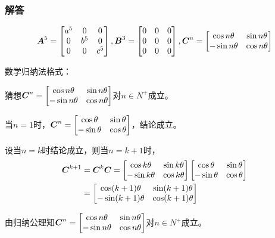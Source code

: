\documentclass{beamer}
\begin{document}
\begin{frame}[allowframebreaks]
\frametitle{解答}

    \begin{equation*}
\boldsymbol{A}^5=\begin{bmatrix}a^5&0&0\\0&b^5&0\\0&0&c^5\end{bmatrix},\boldsymbol{B}^3=\begin{bmatrix}0&0&0\\0&0&0\\0&0&0\end{bmatrix},\boldsymbol{C}^n=\begin{bmatrix}\cos n\theta&\sin n\theta\\-\sin n\theta&\cos n\theta\end{bmatrix}
    \end{equation*}

    数学归纳法格式：

    猜想\(\boldsymbol{C}^n=\begin{bmatrix}\cos n\theta&\sin n\theta\\-\sin n\theta&\cos n\theta\end{bmatrix}\)对\(n\in N^+\)成立。

    当\(n=1\)时，\(\boldsymbol{C}^n=\begin{bmatrix}\cos \theta&\sin \theta\\-\sin \theta&\cos \theta\end{bmatrix}\)，结论成立。

    设当\(n=k\)时结论成立，则当\(n=k+1\)时，
    \begin{align*}
        \boldsymbol{C}^{k+1} & =\boldsymbol{C}^k\boldsymbol{C}=\begin{bmatrix}\cos k\theta&\sin k\theta\\-\sin k\theta&\cos k\theta\end{bmatrix}\begin{bmatrix}\cos \theta&\sin \theta\\-\sin \theta&\cos \theta\end{bmatrix} \\
                    & =\begin{bmatrix}\cos (k+1)\theta&\sin (k+1)\theta\\-\sin (k+1)\theta&\cos (k+1)\theta\end{bmatrix}
    \end{align*}

    由归纳公理知\(\boldsymbol{C}^n=\begin{bmatrix}\cos n\theta&\sin n\theta\\-\sin n\theta&\cos n\theta\end{bmatrix}\)对\(n\in N^+\)成立。

\end{frame}
\end{document}
